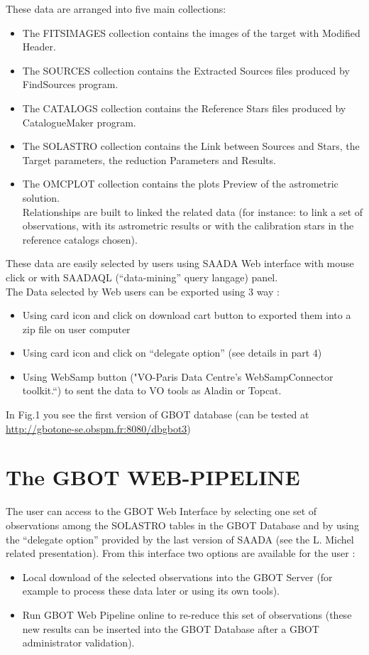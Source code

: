 \noindent These data are arranged into five main collections: 

\begin{itemize}
\item The FITSIMAGES collection contains the images of the target with Modified Header.
\item The SOURCES collection contains the Extracted Sources files produced by FindSources program.
\item The CATALOGS collection contains the Reference Stars files produced by CatalogueMaker program.
\item The SOLASTRO collection contains the Link between Sources and Stars, the Target parameters, the reduction Parameters and Results.
\item The OMCPLOT collection contains the plots Preview of the astrometric solution.\\
Relationships are built to linked the related data (for instance: to link a set of observations, with its astrometric results or with the calibration stars in the reference catalogs chosen).
\end{itemize}

These data are easily selected by users using SAADA Web interface with mouse click or with SAADAQL (“data-mining” query langage) panel. \\
The Data selected by Web users can be exported using 3 way :\\
\begin{itemize}
\item Using card icon and click on download cart button to exported them into a zip file on user computer
\item Using card icon and click on “delegate option” (see details in part 4)
\item Using WebSamp button ("VO-Paris Data Centre's WebSampConnector toolkit.“) to sent the data to VO tools as Aladin or Topcat.
\end{itemize}
\hspace*{0.25cm}In Fig.1 you see the  first version of GBOT database (can be tested at \url{http://gbotone-se.obspm.fr:8080/dbgbot3})

\section{The GBOT WEB-PIPELINE}
The user can access to the GBOT Web Interface by selecting one set of observations among the SOLASTRO tables
in the GBOT Database and by using the “delegate option” provided by the last version of SAADA
(see the L. Michel related presentation). From this interface two options are available for the user :
\begin{itemize}
\item Local download of the selected observations into the GBOT Server
(for example to process these data later or using its own tools).\\
\item Run GBOT Web Pipeline online to re-reduce this set of observations
(these new results can be inserted into the GBOT Database after a GBOT administrator validation).
\end{itemize}

